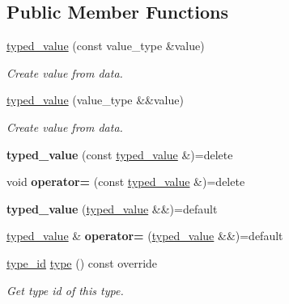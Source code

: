 \subsection*{Public Member Functions}
\begin{DoxyCompactItemize}
\item 
\mbox{\hyperlink{classdice_1_1typed__value_a44f8d5dc37013a90d605e67f71741837}{typed\+\_\+value}} (const value\+\_\+type \&value)
\begin{DoxyCompactList}\small\item\em Create value from data. \end{DoxyCompactList}\item 
\mbox{\hyperlink{classdice_1_1typed__value_a7cd2dad2087902ab85028fddf7c75c0b}{typed\+\_\+value}} (value\+\_\+type \&\&value)
\begin{DoxyCompactList}\small\item\em Create value from data. \end{DoxyCompactList}\item 
\mbox{\label{classdice_1_1typed__value_a7ceb94854137f6ce6fbde9ce8d1b625a}} 
{\bfseries typed\+\_\+value} (const \mbox{\hyperlink{classdice_1_1typed__value}{typed\+\_\+value}} \&)=delete
\item 
\mbox{\label{classdice_1_1typed__value_a98cc3aaf7cfc64ec2cc5e64e66c8d9c0}} 
void {\bfseries operator=} (const \mbox{\hyperlink{classdice_1_1typed__value}{typed\+\_\+value}} \&)=delete
\item 
\mbox{\label{classdice_1_1typed__value_a3e8c1b40c238cf32e781a148baa03037}} 
{\bfseries typed\+\_\+value} (\mbox{\hyperlink{classdice_1_1typed__value}{typed\+\_\+value}} \&\&)=default
\item 
\mbox{\label{classdice_1_1typed__value_adfa842566fd143193eb0967a6b500626}} 
\mbox{\hyperlink{classdice_1_1typed__value}{typed\+\_\+value}} \& {\bfseries operator=} (\mbox{\hyperlink{classdice_1_1typed__value}{typed\+\_\+value}} \&\&)=default
\item 
\mbox{\hyperlink{value_8hpp_ab9af7d8ecc381e026ca4d07a745f23eb}{type\+\_\+id}} \mbox{\hyperlink{classdice_1_1typed__value_aa75a4167e6d3ff2640fd2fa65442e2ed}{type}} () const override
\begin{DoxyCompactList}\small\item\em Get type id of this type. \end{DoxyCompactList}\item 

\end{DoxyCompactItemize}
